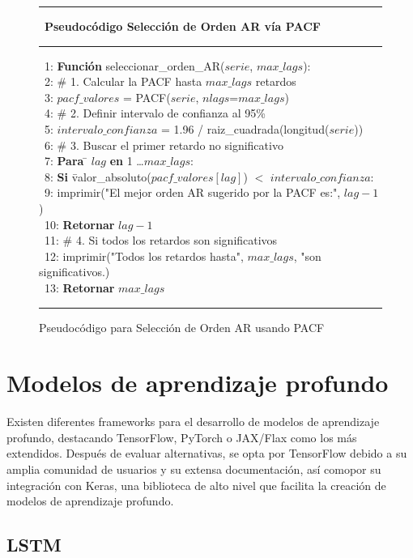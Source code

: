 \begin{figure}[H]
{\small
 \hrule \
 {\bf\small Pseudocódigo Selección de Orden AR vía PACF}
 \hrule
\begin{center}
\begin{tabbing}
\ 1: {\bf Fun}\={\bf ción} seleccionar\_orden\_AR($serie$, $max\_lags$): \\
\ 2: \> \# 1. Calcular la PACF hasta $max\_lags$ retardos \\
\ 3: \> $pacf\_valores$ = PACF($serie$, $nlags$=$max\_lags$) \\
\ 4: \> \# 2. Definir intervalo de confianza al 95\% \\
\ 5: \> $intervalo\_confianza$ = 1.96 / raiz\_cuadrada(longitud($serie$)) \\
\ 6: \> \# 3. Buscar el primer retardo no significativo \\
\ 7: \> {\bf Para} \= $lag$ {\bf en} 1 \dots $max\_lags$: \\
\ 8: \> \> {\bf Si} \= valor\_absoluto($pacf\_valores[lag]$) $<$ $intervalo\_confianza$: \\
\ 9: \> \> \> imprimir("El mejor orden AR sugerido por la PACF es:", $lag-1$) \\
\ 10: \> \> \> {\bf Retornar} $lag-1$ \\
\ 11: \> \# 4. Si todos los retardos son significativos \\
\ 12: \> imprimir("Todos los retardos hasta", $max\_lags$, "son significativos.) \\
\ 13: \> {\bf Retornar} $max\_lags$ \\
\end{tabbing}
\end{center}
\hrule
}
\caption{Pseudocódigo para Selección de Orden AR usando PACF}
\label{pacf_ar_order}
\end{figure}


\section{Modelos de aprendizaje profundo}
Existen diferentes frameworks para el desarrollo de modelos de aprendizaje profundo, destacando TensorFlow, PyTorch o JAX/Flax como los más extendidos.
Después de evaluar alternativas, se opta por TensorFlow debido a su amplia comunidad de usuarios y su extensa documentación, así comopor su integración con Keras, 
una biblioteca de alto nivel que facilita la creación de modelos de aprendizaje profundo.

\subsection{LSTM}

